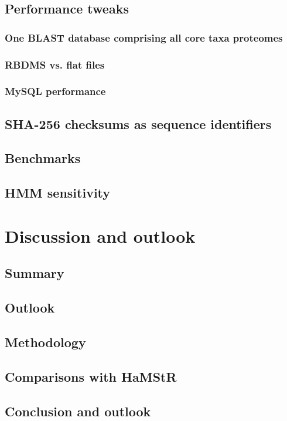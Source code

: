 \documentclass[a4paper,13pt]{scrreprt}
\newcommand{\hamstr}{HaMStR\xspace}
\begin{document}
	\section{Performance tweaks}
		\subsection{One BLAST database comprising all core taxa proteomes}
			
		\subsection{RBDMS vs. flat files}
		\subsection{MySQL performance}
	\section{SHA-256 checksums as sequence identifiers}
		
	\section{Benchmarks}
	\section{HMM sensitivity}

\chapter{Discussion and outlook}
	\section{Summary}
	\section{Outlook}
\clearpage

\section{Methodology}
\clearpage

\section{Comparisons with \hamstr}
\clearpage

\section{Conclusion and outlook}
\clearpage
\end{document}
